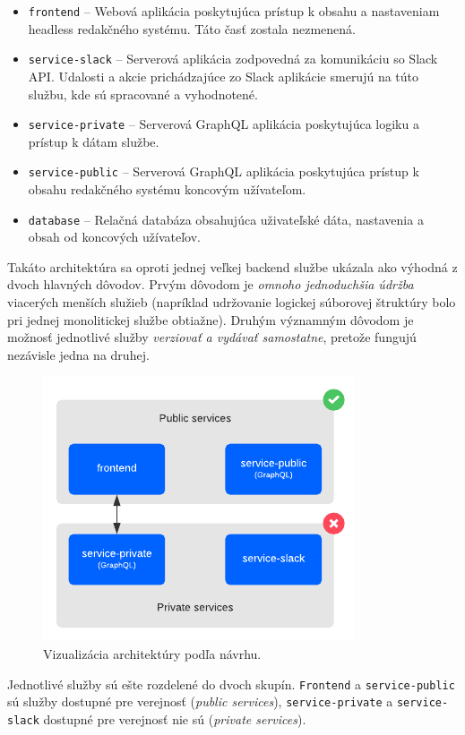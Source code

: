 \begin{itemize}
	\item \texttt{frontend} -- Webová aplikácia poskytujúca prístup k obsahu a nastaveniam headless redakčného systému. Táto časť zostala nezmenená.
	\item \texttt{service-slack} -- Serverová aplikácia zodpovedná za komunikáciu so Slack API. Udalosti a akcie prichádzajúce zo Slack aplikácie smerujú na túto službu, kde sú spracované a vyhodnotené.
	\item \texttt{service-private} -- Serverová GraphQL aplikácia poskytujúca logiku a prístup k dátam  službe.
	\item \texttt{service-public} -- Serverová GraphQL aplikácia poskytujúca prístup k obsahu redakčného systému koncovým užívateľom.
	\item \texttt{database} -- Relačná databáza obsahujúca uživateľské dáta, nastavenia a obsah od koncových užívateľov.
\end{itemize}

\noindent Takáto architektúra sa oproti jednej veľkej backend službe ukázala ako výhodná z dvoch hlavných dôvodov. Prvým dôvodom je \emph{omnoho jednoduchšia údržba} viacerých menších služieb (napríklad udržovanie logickej súborovej štruktúry bolo pri jednej monolitickej službe obtiažne). Druhým významným dôvodom je možnosť jednotlivé služby \emph{verziovať a vydávať samostatne}, pretože fungujú nezávisle jedna na druhej.


\begin{figure}[h]
	\centering
	\includegraphics[scale=1.4]{obrazky-figures/architecture}
	\caption{Vizualizácia architektúry podľa návrhu.}
\end{figure}

Jednotlivé služby sú ešte rozdelené do dvoch skupín. \texttt{Frontend} a \texttt{service-public} sú služby dostupné pre verejnosť (\emph{public services}), \texttt{service-private} a \texttt{service-slack} dostupné pre verejnosť nie sú (\emph{private services}). 

